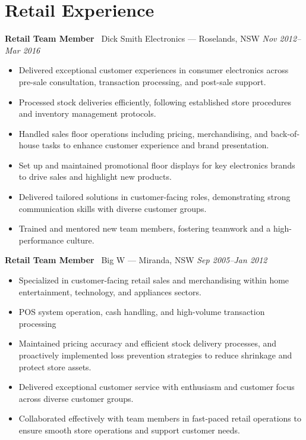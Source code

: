\documentclass[a4paper,10pt]{article}
\begin{document}
\section*{Retail Experience}
\textbf{Retail Team Member} \textbar\ Dick Smith Electronics --- Roselands, NSW \hfill \textit{Nov 2012--Mar 2016}
\begin{itemize}[nosep,leftmargin=*,topsep=0pt,partopsep=0pt,itemsep=2pt]
\item Delivered exceptional customer experiences in consumer electronics across pre-sale consultation, transaction processing, and post-sale support.
\item Processed stock deliveries efficiently, following established store procedures and inventory management protocols.
\item Handled sales floor operations including pricing, merchandising, and back-of-house tasks to enhance customer experience and brand presentation.
\item Set up and maintained promotional floor displays for key electronics brands to drive sales and highlight new products.
\item Delivered tailored solutions in customer-facing roles, demonstrating strong communication skills with diverse customer groups.
\item Trained and mentored new team members, fostering teamwork and a high-performance culture.
\end{itemize}
\textbf{Retail Team Member} \textbar\ Big W --- Miranda, NSW \hfill \textit{Sep 2005--Jan 2012}
\begin{itemize}[nosep,leftmargin=*,topsep=0pt,partopsep=0pt,itemsep=2pt]
\item Specialized in customer-facing retail sales and merchandising within home entertainment, technology, and appliances sectors.
\item POS system operation, cash handling, and high-volume transaction processing
\item Maintained pricing accuracy and efficient stock delivery processes, and proactively implemented loss prevention strategies to reduce shrinkage and protect store assets.
\item Delivered exceptional customer service with enthusiasm and customer focus across diverse customer groups.
\item Collaborated effectively with team members in fast-paced retail operations to ensure smooth store operations and support customer needs.
\end{itemize}
\end{document}
